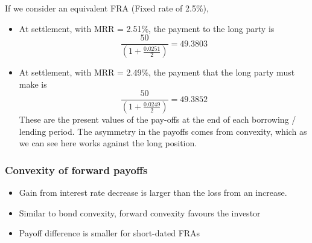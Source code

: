 \documentclass[../notes_compiled.tex]{subfiles}
\begin{document}
\begin{itemize}
{\item[] If we consider an equivalent FRA (Fixed rate of 2.5\%), 
\begin{itemize}
\item At settlement, with MRR = 2.51\%, the payment to the long party is 
\begin{equation*}
\frac{50}{\left( 1 + \frac{0.0251}{2}\right)} = 49.3803
\end{equation*}
\item At settlement, with MRR = 2.49\%, the payment that the long party must make is 
\begin{equation*}
\frac{50}{\left(1 + \frac{0.0249}{2} \right)} = 49.3852
\end{equation*}
These are the present values of the pay-offs at the end of each borrowing / lending period. The asymmetry in the payoffs comes from convexity, which as we can see here works against the long position.
\end{itemize}
}
\end{itemize}
\subsubsection{Convexity of forward payoffs}
\begin{itemize}
\item Gain from interest rate decrease is larger than the loss from an increase.
\item Similar to bond convexity, forward convexity favours the investor
\item Payoff difference is smaller for short-dated FRAs 
\end{itemize}
\end{document}
